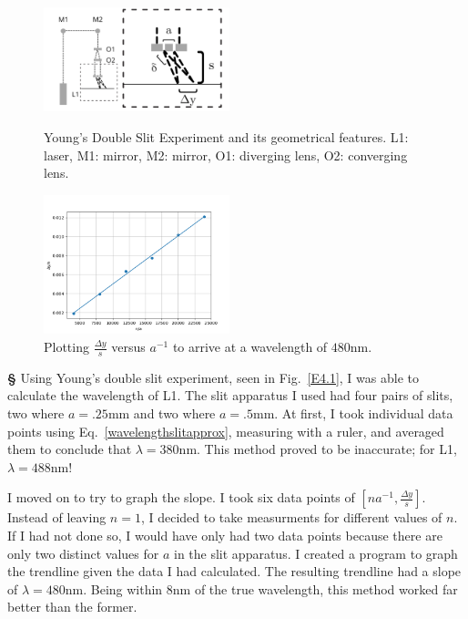 \documentclass[12pt]{article}
\begin{document}
\newpage
\noindent
\begin{figure}
  \begin{center}
    \includegraphics[width=0.48\textwidth]{E4.1}
  \end{center}
  \caption{Young's Double Slit Experiment and its geometrical features. L1: laser, M1: mirror, M2: mirror, O1: diverging lens, O2: converging lens.}\label{E4.1}
  \begin{center}
    \includegraphics[width=0.48\textwidth]{E4.2}
  \end{center}
  \caption{Plotting $\frac{\Delta{y}}{s}$ versus $a^{-1}$ to arrive at a wavelength of $480$nm.}\label{E4.2}
\end{figure}
\large{\textbf{\S}}
Using Young's double slit experiment, seen in Fig.~\ref{E4.1}, I was able to calculate the wavelength of L1. The slit apparatus I used had four pairs of slits, two where $a=.25$mm and two where $a=.5$mm. At first, I took individual data points using Eq.~\eqref{wavelengthslitapprox}, measuring with a ruler, and averaged them to conclude that $\lambda=380$nm. This method proved to be inaccurate; for L1, $\lambda=488$nm!

I moved on to try to graph the slope. I took six data points of $[na^{-1}, \frac{\Delta{y}}{s}]$. Instead of leaving $n=1$, I decided to take measurments for different values of $n$. If I had not done so, I would have only had two data points because there are only two distinct values for $a$ in the slit apparatus. I created a program to graph the trendline given the data I had calculated. The resulting trendline had a slope of $\lambda=480$nm. Being within 8nm of the true wavelength, this method worked far better than the former.
\end{document}
